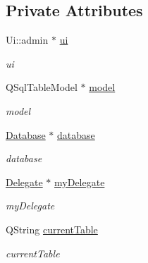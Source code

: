 \subsection*{Private Attributes}
\begin{DoxyCompactItemize}
\item 
\mbox{\label{classadmin_a5afbc6f5e00ffdddc1f6d6e3c412116f}} 
Ui\+::admin $\ast$ \hyperlink{classadmin_a5afbc6f5e00ffdddc1f6d6e3c412116f}{ui}
\begin{DoxyCompactList}\small\item\em ui \end{DoxyCompactList}\item 
\mbox{\label{classadmin_a90981a64d4f5af2acf8c42d5ca8cb058}} 
Q\+Sql\+Table\+Model $\ast$ \hyperlink{classadmin_a90981a64d4f5af2acf8c42d5ca8cb058}{model}
\begin{DoxyCompactList}\small\item\em model \end{DoxyCompactList}\item 
\mbox{\label{classadmin_aeec70de947d603e62874814e1e8db8a0}} 
\hyperlink{class_database}{Database} $\ast$ \hyperlink{classadmin_aeec70de947d603e62874814e1e8db8a0}{database}
\begin{DoxyCompactList}\small\item\em database \end{DoxyCompactList}\item 
\mbox{\label{classadmin_a28fda990b6ddda4a2713b3b966f7abd8}} 
\hyperlink{class_delegate}{Delegate} $\ast$ \hyperlink{classadmin_a28fda990b6ddda4a2713b3b966f7abd8}{my\+Delegate}
\begin{DoxyCompactList}\small\item\em my\+Delegate \end{DoxyCompactList}\item 
\mbox{\label{classadmin_a50e7eb97dbdcf3733c8984d0f63b8e32}} 
Q\+String \hyperlink{classadmin_a50e7eb97dbdcf3733c8984d0f63b8e32}{current\+Table}
\begin{DoxyCompactList}\small\item\em current\+Table \end{DoxyCompactList}\item 
\mbox{\label{classadmin_a8e90fdfeb2ac31f837dcc71dd2bcb04e}} 

\end{DoxyCompactItemize}
